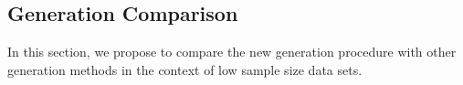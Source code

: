 \documentclass[10pt,journal,compsoc]{IEEEtran}
\begin{document}



    \subsection{Generation Comparison}\label{Sec: Generation comparison}
    
        In this section, we propose to compare the new generation procedure with other generation methods in the context of low sample size data sets. 
\end{document}
